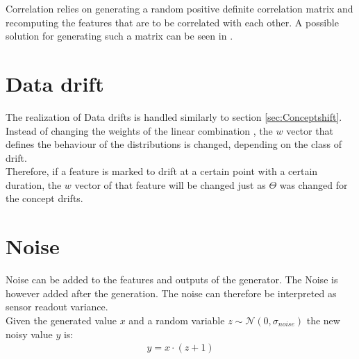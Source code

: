 \documentclass[12pt,a4paper,oneside,ngerman]{article}
\theoremstyle{plain}
\begin{document}
	Correlation relies on generating a random positive definite correlation matrix and recomputing the features that are to be correlated with each other. A possible solution for generating such a matrix can be seen in \cite{Correlation_generation}.
	
	\section{Data drift}
	The realization of Data drifts is handled similarly to section \ref{sec:Conceptshift}. Instead of changing the weights of the linear combination , the $w$ vector that defines the behaviour of the distributions is changed, depending on the class of drift.\\
	Therefore, if a feature is marked to drift at a certain point with a certain duration, the $w$ vector of that feature will be changed just as $\Theta$ was changed for the concept drifts.
	
	\section{Noise}
	Noise can be added to the features and outputs of the generator. The Noise is however added after the generation. The noise can therefore be interpreted as sensor readout variance.\\
	Given the generated value $x$ and a random variable $z \sim \mathcal{N}(0,\sigma_{noise})$ the new noisy value $y$ is:
	\begin{align*}
		y = x \cdot (z + 1)
	\end{align*} 
	
	
	
	

\end{document}
